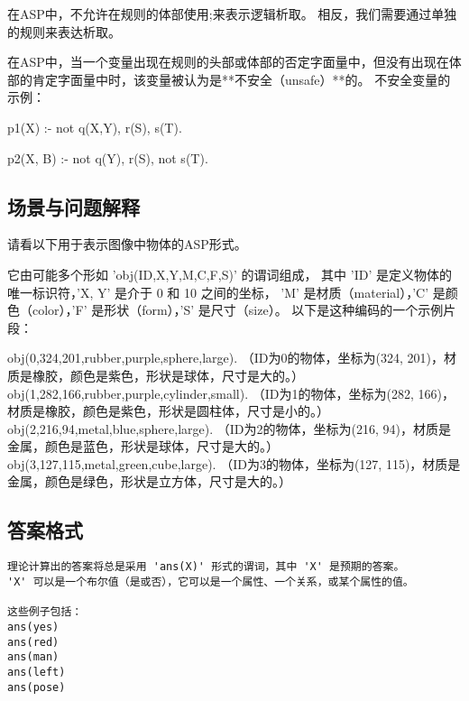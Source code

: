 在ASP中，不允许在规则的体部使用;来表示逻辑析取。
相反，我们需要通过单独的规则来表达析取。

在ASP中，当一个变量出现在规则的头部或体部的否定字面量中，但没有出现在体部的肯定字面量中时，该变量被认为是**不安全（unsafe）**的。
不安全变量的示例：

p1(X) :- not q(X,Y), r(S), s(T).

p2(X, B) :- not q(Y), r(S), not s(T).
\subsection{场景与问题解释}
\label{appendix:scene-question-explanation}
请看以下用于表示图像中物体的ASP形式。

它由可能多个形如 'obj(ID,X,Y,M,C,F,S)' 的谓词组成，
其中 'ID' 是定义物体的唯一标识符，'X, Y' 是介于 0 和 10 之间的坐标，
'M' 是材质（material），'C' 是颜色（color），'F' 是形状（form），'S' 是尺寸（size）。
以下是这种编码的一个示例片段：

obj(0,324,201,rubber,purple,sphere,large). （ID为0的物体，坐标为(324, 201)，材质是橡胶，颜色是紫色，形状是球体，尺寸是大的。）
obj(1,282,166,rubber,purple,cylinder,small). （ID为1的物体，坐标为(282, 166)，材质是橡胶，颜色是紫色，形状是圆柱体，尺寸是小的。）
obj(2,216,94,metal,blue,sphere,large).   （ID为2的物体，坐标为(216, 94)，材质是金属，颜色是蓝色，形状是球体，尺寸是大的。）
obj(3,127,115,metal,green,cube,large).   （ID为3的物体，坐标为(127, 115)，材质是金属，颜色是绿色，形状是立方体，尺寸是大的。）
\subsection{答案格式}
\begin{lstlisting}
理论计算出的答案将总是采用 'ans(X)' 形式的谓词，其中 'X' 是预期的答案。
'X' 可以是一个布尔值（是或否），它可以是一个属性、一个关系，或某个属性的值。

这些例子包括：
ans(yes)
ans(red)
ans(man)
ans(left)
ans(pose)
\end{lstlisting}
